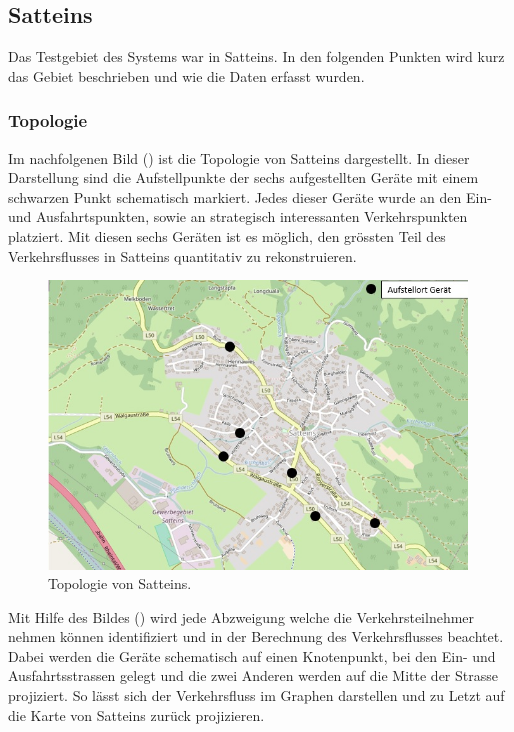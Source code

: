 \subsection{Satteins}
Das Testgebiet des Systems war in Satteins. In den folgenden Punkten wird kurz das Gebiet beschrieben und wie die Daten erfasst wurden.
\subsubsection{Topologie}
Im nachfolgenen Bild () ist die Topologie von Satteins dargestellt. In dieser Darstellung sind die Aufstellpunkte der sechs aufgestellten Geräte mit einem schwarzen Punkt schematisch markiert. Jedes dieser Geräte wurde an den Ein- und Ausfahrtspunkten, sowie an strategisch interessanten Verkehrspunkten platziert. Mit diesen sechs Geräten ist es möglich, den grössten Teil des Verkehrsflusses in Satteins quantitativ zu rekonstruieren. 

\begin{figure}[H]
  \centering
  \includegraphics[width=0.99\textwidth]{Resultate/Satteins.jpg} 
  \caption{Topologie von Satteins. \cite{satteins}}
  \label{bSatteins}
\end{figure}

Mit Hilfe des Bildes () wird jede Abzweigung welche die Verkehrsteilnehmer nehmen können identifiziert und in der Berechnung des Verkehrsflusses beachtet. Dabei werden die Geräte schematisch auf einen Knotenpunkt, bei den Ein- und Ausfahrtsstrassen gelegt und die zwei Anderen werden auf die Mitte der Strasse projiziert. So lässt sich der Verkehrsfluss im Graphen darstellen und zu Letzt auf die Karte von Satteins zurück projizieren.

